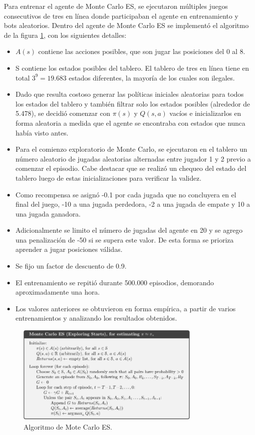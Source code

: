 Para entrenar el agente de Monte Carlo ES, se ejecutaron múltiples juegos consecutivos de tres en línea donde participaban el agente en entrenamiento y bots aleatorios. Dentro del agente de Monte Carlo ES se implementó el algoritmo de la figura \ref{fig:algorithm_monte_carlo}, con los siguientes detalles:
\begin{itemize}
    \item \(A(s)\) contiene las acciones posibles, que son jugar las posiciones del 0 al 8.
    \item S contiene los estados posibles del tablero. El tablero de tres en línea tiene en total \(3^9 = 19.683\) estados diferentes, la mayoría de los cuales son ilegales.
    \item  Dado que resulta costoso generar las políticas iniciales aleatorias para todos los estados del tablero y también filtrar solo los estados posibles (alrededor de 5.478), se decidió comenzar con \(\pi(s)\) y \(Q(s,a)\) vacíos e inicializarlos en forma aleatoria a medida que el agente se encontraba con estados que nunca había visto antes.
    \item Para el comienzo exploratorio de Monte Carlo, se ejecutaron en el tablero un número aleatorio de jugadas aleatorias alternadas entre jugador 1 y 2 previo a comenzar el episodio. Cabe destacar que se realizó un chequeo del estado del tablero luego de estas inicializaciones para verificar la validez.
    \item Como recompensa se asignó -0.1 por cada jugada que no concluyera en el final del juego, -10 a una jugada perdedora, -2 a una jugada de empate y 10 a una jugada ganadora.
    \item Adicionalmente se limito el número de jugadas del agente en 20 y se agrego una penalización de -50 si se supera este valor. De esta forma se prioriza aprender a jugar posiciones válidas.
    \item Se fijo un factor de descuento de 0.9.
    \item El entrenamiento se repitió durante 500.000 episodios, demorando aproximadamente una hora.
    \item Los valores anteriores se obtuvieron en forma empírica, a partir de varios entrenamientos y analizando los resultados obtenidos.
\end{itemize} 

\begin{figure}[htbp]
	\centering
	\includegraphics[width=0.8\textwidth]{./Figures/algorithm_monte_carlo.png}
	\caption{Algoritmo de Mote Carlo ES.}
	\label{fig:algorithm_monte_carlo}
\end{figure}

